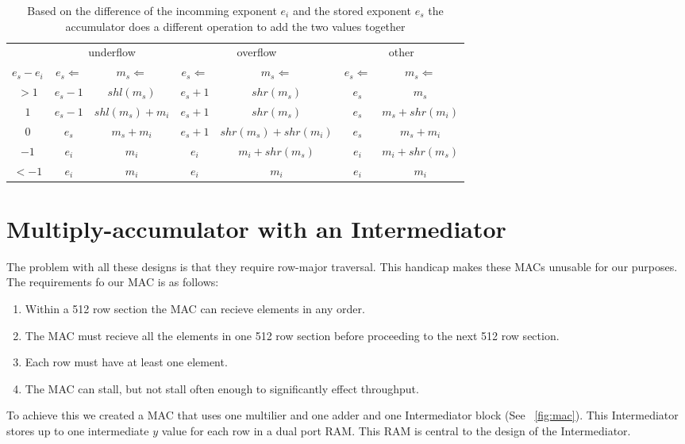 \begin{table}
    \caption[How the stored value is updated in a in-order accumulator based on the stored value and incomming value.]{Based on the difference of the incomming exponent $e_i$ and the stored exponent $e_s$ the accumulator does a different operation to add the two values together}
    \label{tbl:accumulator_ops}
    \begin{tabular}{c|cc|cc|cc}
        & \multicolumn{2}{c|}{underflow} & \multicolumn{2}{c|}{overflow} & \multicolumn{2}{c}{other} \\
        $e_s - e_i$ & $e_s\Leftarrow$ & $m_s\Leftarrow$ & $e_s\Leftarrow$ & $m_s\Leftarrow$ & $e_s\Leftarrow$ & $m_s\Leftarrow$ \\
        \hline
        $>1$ & $e_s - 1$ & $shl(m_s)$ & $e_s + 1$ & $shr(m_s)$ & $e_s$ & $m_s$ \\
        $1$ & $e_s - 1$ & $shl(m_s) + m_i$ & $e_s + 1$ & $shr(m_s)$ & $e_s$ & $m_s + shr(m_i)$ \\
        $0$ & $e_s$ & $m_s + m_i$ & $e_s + 1$ & $shr(m_s) + shr(m_i)$ & $e_s$ & $m_s + m_i$ \\
        $-1$ & $e_i$ & $m_i$ & $e_i$ & $m_i + shr(m_s)$ & $e_i$ & $m_i + shr(m_s)$\\
        $<-1$ & $e_i$ & $m_i$ & $e_i$ & $m_i$ & $e_i$ & $m_i$ \\
    \end{tabular}
\end{table}

\section{Multiply-accumulator with an Intermediator}
\label{sec:intermediator}
The problem with all these designs is that they require row-major traversal. This handicap makes these MACs unusable for our purposes. The requirements fo our MAC is as follows:
\begin{enumerate}
    \item Within a 512 row section the MAC can recieve elements in any order.
    \item The MAC must recieve all the elements in one 512 row section before proceeding to the next 512 row section.
    \item Each row must have at least one element.
    \item The MAC can stall, but not stall often enough to significantly effect throughput.

\end{enumerate}
To achieve this we created a MAC that uses one multilier and one adder and one Intermediator block (See \figurename~\ref{fig:mac}). This Intermediator stores up to one intermediate $y$ value for each row in a dual port RAM. This RAM is central to the design of the Intermediator.

